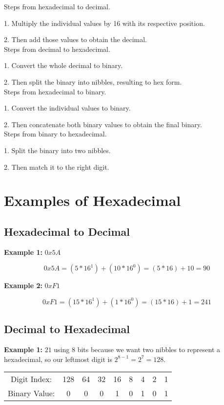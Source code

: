 \documentclass{article}
\begin{document}
\noindent Steps from hexadecimal to decimal.

1. Multiply the individual values by 16 with its respective position.

2. Then add those values to obtain the decimal. \\

\noindent Steps from decimal to hexadecimal.

1. Convert the whole decimal to binary.

2. Then split the binary into nibbles, resulting to hex form. \\

\noindent Steps from hexadecimal to binary. 

1. Convert the individual values to binary.

2. Then concatenate both binary values to obtain the final binary. \\

\noindent Steps from binary to hexadecimal. 

1. Split the binary into two nibbles.

2. Then match it to the right digit. 

\section{Examples of Hexadecimal}
\subsection*{Hexadecimal to Decimal}
\textbf{Example 1:} $0x5A$

\[
0x5A = (5 * 16^1) + (10 * 16^0) = (5 * 16) + 10 = 90
\] 

\noindent \textbf{Example 2:} $0xF1$ 

\[
0xF1 = (15 * 16^1) + (1 * 16^0) = (15 * 16) + 1 = 241
\] 

\subsection*{Decimal to Hexadecimal}
\textbf{Example 1:} $21$ using 8 bits because we want two nibbles to represent a hexadecimal, so our leftmost
digit is $2^{8-1} = 2^7 = 128$.

\begin{center}
\begin{tabular}{c c c c c c c c c}
Digit Index: & 128 & 64 & 32 & 16 & 8 & 4 & 2 & 1 \\
Binary Value: & 0 & 0 & 0 & 1 & 0 & 1 & 0 & 1 \\
\end{tabular}
\end{center} 
\end{document}
